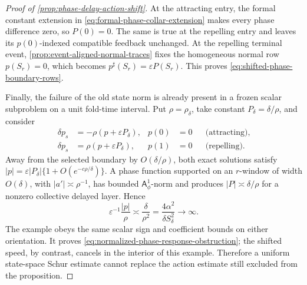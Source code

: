 \begin{proof}[Proof of \cref{prop:phase-delay-action-shift}]
At the attracting entry, the formal constant extension in
\cref{eq:formal-phase-collar-extension} makes every phase difference zero,
so \(P(0)=0\).  The same is true at the repelling entry and leaves its
\(p(0)\)-indexed compatible feedback unchanged.  At the repelling terminal
event, \cref{prop:event-aligned-normal-traces} fixes the homogeneous normal
row \(p(S_r)=0\), which becomes
\(p^\sharp(S_r)=\varepsilon P(S_r)\).  This proves
\cref{eq:shifted-phase-boundary-rows}.

Finally, the failure of the old state norm is already present in a frozen
scalar subproblem on a unit fold-time interval.  Put
\(\rho=\rho_\delta\), take constant
\(P_\delta=\delta/\rho\), and consider
\begin{align*}
 \delta p_s&=-\rho(p+\varepsilon P_\delta),&p(0)&=0
       &&\text{(attracting)},\\
 \delta p_s&= \rho(p+\varepsilon P_\delta),&p(1)&=0
       &&\text{(repelling)}.
\end{align*}
Away from the selected boundary by \(O(\delta/\rho)\), both exact solutions
satisfy
\(
 |p|=\varepsilon|P_\delta|
       \{1+O(e^{-c\rho/\delta})\}
\).
A phase function supported on an \(r\)-window of width \(O(\delta)\), with
\(|a'|\asymp\rho^{-1}\), has bounded
\(\mathsf A_\phi^1\)-norm and produces
\(|P|\asymp\delta/\rho\) for a nonzero collective delayed layer.  Hence
\begin{equation*}
 \varepsilon^{-1}\frac{|p|}{\rho}
 \asymp\frac{\delta}{\rho^2}
 =\frac{4\alpha^2}{\delta S_\delta^2}\longrightarrow\infty.
\end{equation*}
The example obeys the same scalar sign and coefficient bounds on either
orientation.  It proves
\cref{eq:normalized-phase-response-obstruction}; the shifted speed, by
contrast, cancels in the interior of this example.  Therefore a uniform
state-space Schur estimate cannot replace the action estimate still
excluded from the proposition.
\end{proof}

